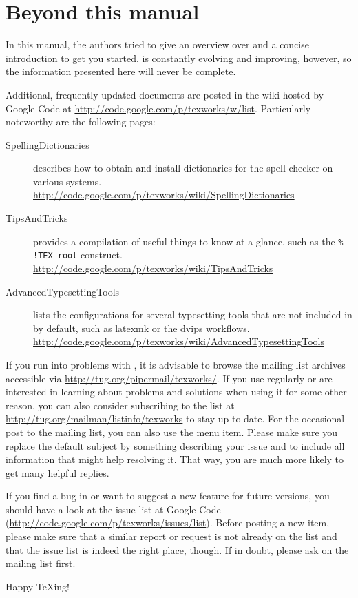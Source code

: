 
\chapter{Beyond this manual}

In this manual, the authors tried to give an overview over {\Tw} and a concise introduction to get you started. {\Tw} is constantly evolving and improving, however, so the information presented here will never be complete.

Additional, frequently updated documents are posted in the wiki hosted by Google Code at \url{http://code.google.com/p/texworks/w/list}. Particularly noteworthy are the following pages:
\begin{description}
\item[SpellingDictionaries] describes how to obtain and install dictionaries for the spell-checker on various systems. \url{http://code.google.com/p/texworks/wiki/SpellingDictionaries}
\item[TipsAndTricks] provides a compilation of useful things to know at a glance, such as the \verb|% !TEX root| construct. \url{http://code.google.com/p/texworks/wiki/TipsAndTricks}
\item[AdvancedTypesettingTools] lists the configurations for several typesetting tools that are not included in {\Tw} by default, such as latexmk or the dvips workflows. \url{http://code.google.com/p/texworks/wiki/AdvancedTypesettingTools}
\end{description}

If you run into problems with {\Tw}, it is advisable to browse the mailing list archives accessible via \url{http://tug.org/pipermail/texworks/}. If you use {\Tw} regularly or are interested in learning about problems and solutions when using it for some other reason, you can also consider subscribing to the list at \url{http://tug.org/mailman/listinfo/texworks} to stay up-to-date. For the occasional post to the mailing list, you can also use the \submenu{} menu item. Please make sure you replace the default subject by something describing your issue and to include all information that might help resolving it. That way, you are much more likely to get many helpful replies.

If you find a bug in {\Tw} or want to suggest a new feature for future versions, you should have a look at the issue list at Google Code (\url{http://code.google.com/p/texworks/issues/list}). Before posting a new item, please make sure that a similar report or request is not already on the list and that the issue list is indeed the right place, though. If in doubt, please ask on the mailing list first.

Happy {\TeX}ing!